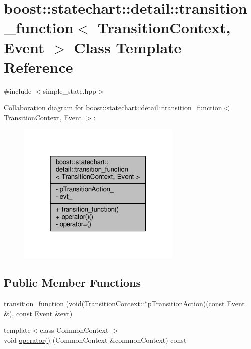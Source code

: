\hypertarget{classboost_1_1statechart_1_1detail_1_1transition__function}{}\section{boost\+:\+:statechart\+:\+:detail\+:\+:transition\+\_\+function$<$ Transition\+Context, Event $>$ Class Template Reference}
\label{classboost_1_1statechart_1_1detail_1_1transition__function}


{\ttfamily \#include $<$simple\+\_\+state.\+hpp$>$}



Collaboration diagram for boost\+:\+:statechart\+:\+:detail\+:\+:transition\+\_\+function$<$ Transition\+Context, Event $>$\+:
\nopagebreak
\begin{figure}[H]
\begin{center}
\leavevmode
\includegraphics[width=223pt]{classboost_1_1statechart_1_1detail_1_1transition__function__coll__graph}
\end{center}
\end{figure}
\subsection*{Public Member Functions}
\begin{DoxyCompactItemize}
\item 
\mbox{\hyperlink{classboost_1_1statechart_1_1detail_1_1transition__function_a9ef040fb0285fc8943484b427a38153b}{transition\+\_\+function}} (void(Transition\+Context\+::$\ast$p\+Transition\+Action)(const Event \&), const Event \&evt)
\item 
{\footnotesize template$<$class Common\+Context $>$ }\\void \mbox{\hyperlink{classboost_1_1statechart_1_1detail_1_1transition__function_a866274b524d0cce2ba4bafc22d49d985}{operator()}} (Common\+Context \&common\+Context) const
\end{DoxyCompactItemize}
